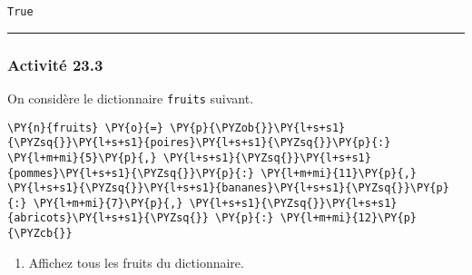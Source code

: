 \documentclass[12pt]{book}
\begin{document}
            \begin{tcolorbox}[breakable, size=fbox, boxrule=.5pt, pad at break*=1mm, opacityfill=0]
\begin{Verbatim}[commandchars=\\\{\}]
True
\end{Verbatim}
\end{tcolorbox}
        
    \begin{center}\rule{0.5\linewidth}{0.5pt}\end{center}

\hypertarget{activituxe9-23.3}{%
\subsubsection{Activité 23.3}\label{activituxe9-23.3}}

On considère le dictionnaire \texttt{fruits} suivant.

    \begin{tcolorbox}[breakable, size=fbox, boxrule=1pt, pad at break*=1mm,colback=cellbackground, colframe=cellborder]
\begin{Verbatim}[commandchars=\\\{\}]
\PY{n}{fruits} \PY{o}{=} \PY{p}{\PYZob{}}\PY{l+s+s1}{\PYZsq{}}\PY{l+s+s1}{poires}\PY{l+s+s1}{\PYZsq{}}\PY{p}{:} \PY{l+m+mi}{5}\PY{p}{,} \PY{l+s+s1}{\PYZsq{}}\PY{l+s+s1}{pommes}\PY{l+s+s1}{\PYZsq{}}\PY{p}{:} \PY{l+m+mi}{11}\PY{p}{,} \PY{l+s+s1}{\PYZsq{}}\PY{l+s+s1}{bananes}\PY{l+s+s1}{\PYZsq{}}\PY{p}{:} \PY{l+m+mi}{7}\PY{p}{,} \PY{l+s+s1}{\PYZsq{}}\PY{l+s+s1}{abricots}\PY{l+s+s1}{\PYZsq{}} \PY{p}{:} \PY{l+m+mi}{12}\PY{p}{\PYZcb{}}
\end{Verbatim}
\end{tcolorbox}

    \begin{enumerate}
\def\labelenumi{\arabic{enumi}.}
\tightlist
\item
  Affichez tous les fruits du dictionnaire.
\end{enumerate}

    \begin{tcolorbox}[breakable, size=fbox, boxrule=1pt, pad at break*=1mm,colback=cellbackground, colframe=cellborder]
\begin{Verbatim}[commandchars=\\\{\}]

\end{Verbatim}
\end{tcolorbox}
\end{document}
